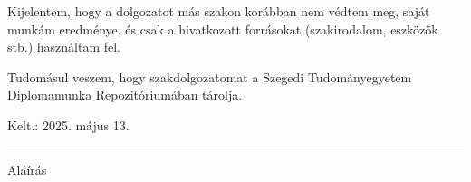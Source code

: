 \documentclass[12pt]{report} %
\begin{document}
Kijelentem, hogy a dolgozatot más szakon korábban nem védtem meg, saját munkám eredménye, és csak a hivatkozott forrásokat (szakirodalom, eszközök stb.) használtam fel.

Tudomásul veszem, hogy szakdolgozatomat a Szegedi Tudományegyetem Diplomamunka Repozitóriumában tárolja.

\vspace{1cm}

{\large Kelt.: 2025. május 13.}

\vspace{0.5cm}
\hfill
\parbox{5cm}{\centering\hrule\vspace{0.3cm} Aláírás}
\end{document}
